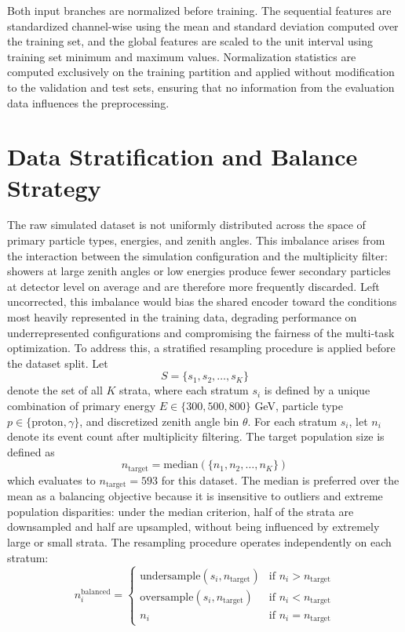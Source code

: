 Both input branches are normalized before training. The sequential features are standardized channel-wise using the mean and standard deviation computed over the training set, and the global features are scaled to the unit interval using training set minimum and maximum values. Normalization statistics are computed exclusively on the training partition and applied without modification to the validation and test sets, ensuring that no information from the evaluation data influences the preprocessing.

\section{Data Stratification and Balance Strategy}

The raw simulated dataset is not uniformly distributed across the space of primary particle types, energies, and zenith angles. This imbalance arises from the interaction between the simulation configuration and the multiplicity filter: showers at large zenith angles or low energies produce fewer secondary particles at detector level on average and are therefore more frequently discarded. Left uncorrected, this imbalance would bias the shared encoder toward the conditions most heavily represented in the training data, degrading performance on underrepresented configurations and compromising the fairness of the multi-task optimization.
To address this, a stratified resampling procedure is applied before the dataset split. Let
\begin{equation}
    S = \{s_1, s_2, \ldots, s_K\}
\end{equation}
denote the set of all $K$ strata, where each stratum $s_i$ is defined by a unique combination of primary energy $E \in \{300,500,800\}$ GeV, particle type $p \in \{\text{proton}, \gamma\}$, and discretized zenith angle bin $\theta$. For each stratum $s_i$, let $n_i$ denote its event count after multiplicity filtering. The target population size is defined as
\begin{equation}
    n_\text{target} = \text{median}(\{n_1, n_2, \ldots, n_K\})
\end{equation}
which evaluates to $n_\text{target} = 593$ for this dataset. The median is preferred over the mean as a balancing objective because it is insensitive to outliers and extreme population disparities: under the median criterion, half of the strata are downsampled and half are upsampled, without being influenced by extremely large or small strata. The resampling procedure operates independently on each stratum:
\begin{equation}
n_i^{\text{balanced}} = \begin{cases}
\text{undersample}(s_i, n_{\text{target}}) & \text{if } n_i > n_{\text{target}} \\
\text{oversample}(s_i, n_{\text{target}}) & \text{if } n_i < n_{\text{target}} \\
n_i & \text{if } n_i = n_{\text{target}}
\end{cases}
\end{equation}


